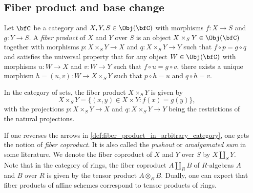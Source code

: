 \subsection{Fiber product and base change}

    \begin{definition}\label{def:fiber_product_in_arbitrary_category}
        Let \(\bfC\) be a category and \(X, Y, S \in \Obj(\bfC)\) with morphisms \(f : X \to S\) and \(g : Y \to S\).
        A \emph{fiber product} of \(X\) and \(Y\) over \(S\) is an object \(X \times_S Y \in \Obj(\bfC)\) together with morphisms \(p : X \times_S Y \to X\) and \(q : X \times_S Y \to Y\) such that \(f \circ p = g \circ q\)
        and satisfies the universal property that for any object \(W \in \Obj(\bfC)\) with morphisms \(u : W \to X\) and \(v : W \to Y\) such that \(f \circ u = g \circ v\),
        there exists a unique morphism \(h = (u,v) : W \to X \times_S Y\) such that \(p \circ h = u\) and \(q \circ h = v\).
        \begin{center}
        \end{center}
    \end{definition}

    \begin{example}\label{eg:fiber_product_in_sets}
        In the category of sets, the fiber product \(X \times_S Y\) is given by
        \[ X \times_S Y = \{(x,y) \in X \times Y : f(x) = g(y)\}, \]
        with the projections \(p : X \times_S Y \to X\) and \(q : X \times_S Y \to Y\) being the restrictions of the natural projections.
    \end{example}

    \begin{remark}\label{rmk:fiber_coproduct_and_in_category_of_R_algebras}
        If one reverses the arrows in \cref{def:fiber_product_in_arbitrary_category}, one gets the notion of \emph{fiber coproduct}.
        It is also called the \emph{pushout} or \emph{amalgamated sum} in some literature.
        We denote the fiber coproduct of \(X\) and \(Y\) over \(S\) by \(X \amalg_S Y\).
        Note that in the category of rings, the fiber coproduct \(A \amalg_R B\) of \(R\)-algebras \(A\) and \(B\) over \(R\) is given by the tensor product \(A \otimes_R B\).
        Dually, one can expect that fiber products of affine schemes correspond to tensor products of rings.
    \end{remark}

